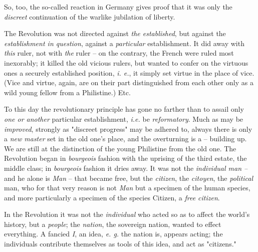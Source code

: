 \documentclass[a4paper]{book}
\begin{document}
So, too, the so-called reaction in Germany gives proof that it was only the 
\textit{discreet} continuation of the warlike jubilation of liberty.

The Revolution was not directed against \textit{the established}, but against 
the \textit{establishment in question}, against a \textit{particular} 
establishment. It did away with \textit{this} ruler, not with \textit{the} 
ruler -- on the contrary, the French were ruled most inexorably; it killed the 
old vicious rulers, but wanted to confer on the virtuous ones a securely 
established position, \textit{i. e.}, it simply set virtue in the place of 
vice. (Vice and virtue, again, are on their part distinguished from each other 
only as a wild young fellow from a Philistine.) Etc.

To this day the revolutionary principle has gone no farther than to assail 
only \textit{one or another} particular establishment, \textit{i.e.} be 
\textit{reformatory}. Much as may be \textit{improved}, strongly as 
"{}discreet progress"{} may be adhered to, always there is only a \textit{new 
master} set in the old one's place, and the overturning is a -- building up. 
We are still at the distinction of the young Philistine from the old one. The 
Revolution began in \textit{bourgeois} fashion with the uprising of the third 
estate, the middle class; in \textit{bourgeois} fashion it dries away. It was 
not the \textit{individual man --} and he alone is \textit{Man} -- that became 
free, but the \textit{citizen}, the \textit{citoyen}, the \textit{political} 
man, who for that very reason is not \textit{Man} but a specimen of the human 
species, and more particularly a specimen of the species Citizen, a 
\textit{free citizen}.

In the Revolution it was not the \textit{individual} who acted so as to affect 
the world's history, but a \textit{people}; the \textit{nation}, the sovereign 
nation, wanted to effect everything. A fancied \textit{I}, an idea, \textit{e. 
g.} the nation is, appears acting; the individuals contribute themselves as 
tools of this idea, and act as "{}citizens."{}
\end{document}
